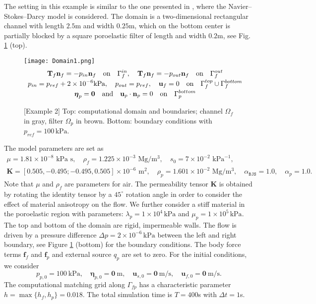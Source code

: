 \documentclass[11pt]{article}
\numberwithin{equation}{section}
\newcommand{\ds}{\displaystyle}
\newcommand{\bbeta}{{\boldsymbol\eta}}
\newcommand{\f}{\mathbf{f}}
\newcommand{\bu}{\mathbf{u}}
\newcommand{\bn}{{\mathbf{n}}}
\newcommand{\0}{{\mathbf{0}}}
\def\bK{\mathbf{K}}
\def\bT{\mathbf{T}}
\def\BJS{\mathtt{BJS}}
\def\qon{{\quad\hbox{on}\quad}}
\def\qan{{\quad\hbox{and}\quad}}
\numberwithin{equation}{section}
\begin{document}
The setting in this example is similar to the 
one presented in \cite{swgbh2020}, where the Navier--Stokes--Darcy model is considered. The domain is a two-dimensional rectangular channel with length $2.5$m and width $0.25$m, which on the bottom center is partially blocked by a square poroelastic filter of length and width $0.2$m, see Fig. \ref{fig:filter} (top).
%
\begin{figure}%
\texttt{[image: Domain1.png]}
%
\begin{equation*}
\begin{array}{c}
\ds \bT_f \bn_f = -p_{in} \bn_f \qon \Gamma_f^{in},\quad \bT_f \bn_f = -p_{out} \bn_f \qon \Gamma_f^{out} \\[0.5ex]
\ds p_{in}= p_{ref} + 2\times 10^{-6} \text{kPa},\quad p_{out} = p_{ref},\quad \bu_f = 0 \qon \Gamma_f^{top} \cup \Gamma_f^{bottom} \\[0.5ex]
\ds \bbeta_p = \0 \qan \bu_p \cdot \bn_p = 0 \qon \Gamma_p^{bottom}
\end{array}
\end{equation*}
\vspace{-0.5cm}
\caption{[Example 2] Top: computational domain and boundaries; channel $\Omega_{f}$ in gray, filter $\Omega_{p}$ in brown. Bottom: boundary conditions with $p_{ref}=100\,\text{kPa}$.}
\label{fig:filter}
\end{figure}
%
The model parameters are set as
%
\begin{equation*}
\begin{array}{c}
\mu=1.81 \times 10^{-8} \text{ kPa s}, \quad \rho_f =1.225 \times 10^{-3} \text{ Mg}/\text{m}^3, \quad s_0=7 \times 10^{-2} \text{ kPa}^{-1}, \\[1ex]
\bK= [ 0.505, -0.495; -0.495,0.505] \times 10^{-6} \text{ m}^2,  \quad \rho_p =1.601 \times 10^{-2} \text{ Mg}/\text{m}^3, \quad \alpha_{\BJS}=1.0, \quad \alpha_p = 1.0.
\end{array}
\end{equation*}
%
Note that $\mu$ and $\rho_f$ are parameters for air. The permeability tensor $\bK$ is obtained by rotating the identity tensor by a $45^\circ$ rotation angle in order to consider the effect of material anisotropy on the flow. We further consider a stiff material in the poroelastic region with parameters:
$\lambda_p=1{\times}10^4\,\text{kPa}$ and $\mu_p = 1{\times}10^5\,\text{kPa}$. 
%
The top and bottom of the domain are rigid, impermeable walls. The flow is driven by a pressure difference $\Delta p = 2\times 10^{-6}\,\text{kPa}$ between the left and right boundary, see Figure \ref{fig:filter} (bottom) for the boundary conditions. The body force terms $\f_f$ and $\f_p$ and external source $q_p$ are set to zero. For the initial conditions, we consider
$$ p_{p,0}=100  \ \text{kPa}, \quad \bbeta_{p,0} = \0  \ \text{m},  \quad \bu_{s,0} = \0 \ \text{m/s},\quad \bu_{f,0} = \0  \ \text{m/s}. $$
%
The computational matching grid along $\Gamma_{fp}$ has a characteristic parameter $h=\max\{ h_f, h_p \} = 0.018$. The total simulation time is $T=400$s with $\Delta t=1$s.
\end{document}
